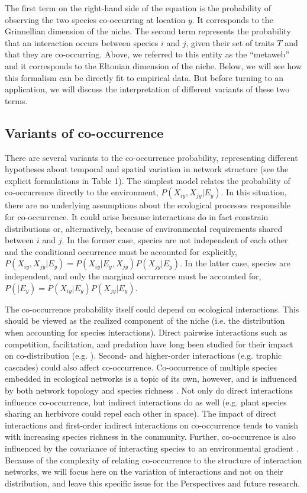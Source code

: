 \documentclass[12pt]{article}
\begin{document}
The first term on the right-hand side of the equation is the probability of
observing the two species co-occurring at location $y$. It corresponds to the
Grinnellian dimension of the niche. The second term represents the probability
that an interaction occurs between species $i$ and $j$, given their set of
traits $T$ and that they are co-occurring. Above, we referred to this entity
as the ``metaweb'' and it corresponds to the Eltonian dimension of the niche. Below,
we will see how this formalism can be directly fit to empirical data. But
before turning to an application, we will discuss the interpretation of
different variants of these two terms.

\subsection*{Variants of co-occurrence}

There are several variants to the co-occurrence probability, representing
different hypotheses about temporal and spatial variation in network structure
(see the explicit formulations in Table 1). The simplest model relates the
probability of co-occurrence directly to the environment, $P(X_{iy},X_{jy}|E_y)$.
In this situation, there are no underlying assumptions about the ecological
processes responsible for co-occurrence. It could arise because interactions
do in fact constrain distributions \citep{Pollock2014, Cazelles2016} or,
alternatively, because of environmental requirements shared between $i$ and
$j$. In the former case, species are not independent of each other and the
conditional occurrence must be accounted for explicitly, $P(X_{iy},X_{jy}
|E_y)=P(X_{iy}|E_y,X_{jy})P(X_{jy}|E_y)$. In the latter case, species are
independent, and only the marginal occurrence must be accounted for, $P(
|E_y)=P(X_{iy} |E_y)P(X_{jy} |E_y)$.

The co-occurrence probability itself could depend on ecological interactions.
This should be viewed as the realized component of the niche (i.e. the
distribution when accounting for species interactions). Direct pairwise
interactions such as competition, facilitation, and predation have long been
studied for their impact on co-distribution (e.g. \citealt{Diamond1976, Connor1980,
Gotelli2000}). Second- and higher-order interactions (e.g. trophic cascades)
could also affect co-occurrence. Co-occurrence of multiple species embedded in
ecological networks is a topic of its own, however, and is influenced by both network
topology and species richness \citep{Cazelles2016}. Not only do direct interactions
influence co-occurrence, but indirect interactions do as well (e.g. plant species
sharing an herbivore could repel each other in space). The impact of direct
interactions and first-order indirect interactions on co-occurrence tends to
vanish with increasing species richness in the community. Further, co-occurrence
is also influenced by the covariance of interacting species to an
environmental gradient \citep{Cazelles2015}. Because of the complexity of relating
co-occurrence to the structure of interaction networks, we will focus here on
the variation of interactions and not on their distribution, and leave this
specific issue for the Perspectives and future research.
\end{document}
